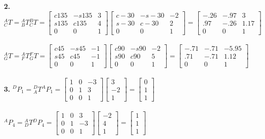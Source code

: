 \documentclass{article}
\begin{document}
\textbf{2. } ${}^A_CT={}^A_BT{}^B_CT=\begin{bmatrix}
c135 & -s135 & 3 \\
s135 & c135 & 4 \\
0 & 0 & 1
\end{bmatrix}\begin{bmatrix}
c-30 & -s-30 & -2 \\
s-30 & c-30 & 2 \\
0 & 0 & 1
\end{bmatrix}=\begin{bmatrix}
-.26 & -.97 & 3 \\
.97 & -.26 & 1.17 \\
0 & 0 & 1
\end{bmatrix}$\\\\
${}^A_GT={}^A_FT{}^F_GT=\begin{bmatrix}
c45 & -s45 & -1 \\
s45 & c45 & -1 \\
0 & 0 & 1
\end{bmatrix}\begin{bmatrix}
c90 & -s90 & -2 \\
s90 & c90 & 5 \\
0 & 0 & 1
\end{bmatrix}=\begin{bmatrix}
-.71 & -.71 & -5.95 \\
.71 & -.71 & 1.12 \\
0 & 0 & 1
\end{bmatrix}$\\\\
\textbf{3. } ${}^DP_1={}^D_AT{}^AP_1=\begin{bmatrix}
1 & 0 & -3\\
0 & 1 & 3\\
0 & 0 & 1
\end{bmatrix}\begin{bmatrix}
3\\
-2\\
1
\end{bmatrix}=\begin{bmatrix}
0\\
1\\
1
\end{bmatrix}$\\\\
${}^AP_4={}^A_DT{}^DP_4=\begin{bmatrix}
1 & 0 & 3\\
0 & 1 & -3\\
0 & 0 & 1
\end{bmatrix}\begin{bmatrix}
-2\\
4\\
1
\end{bmatrix}=\begin{bmatrix}
1\\
1\\
1
\end{bmatrix}$\\\\
\end{document}
